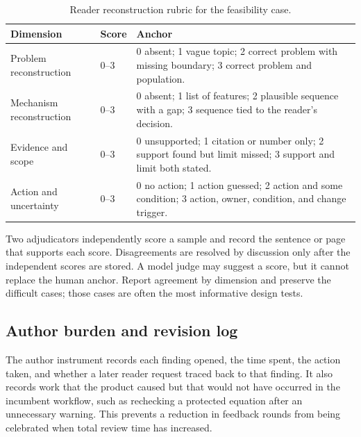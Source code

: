 \begin{table}[H]
\centering
\small
\begin{tabularx}{\textwidth}{@{}p{}p{}L@{}}
\toprule
Dimension & Score & Anchor \\
\midrule
Problem reconstruction & 0--3 & 0 absent; 1 vague topic; 2 correct problem
with missing boundary; 3 correct problem and population. \\
Mechanism reconstruction & 0--3 & 0 absent; 1 list of features; 2 plausible
sequence with a gap; 3 sequence tied to the reader's decision. \\
Evidence and scope & 0--3 & 0 unsupported; 1 citation or number only; 2
support found but limit missed; 3 support and limit both stated. \\
Action and uncertainty & 0--3 & 0 no action; 1 action guessed; 2 action and
some condition; 3 action, owner, condition, and change trigger. \\
\bottomrule
\end{tabularx}
\caption{Reader reconstruction rubric for the feasibility case.}
\label{tab:reader-instrument}
\end{table}

Two adjudicators independently score a sample and record the sentence or page
that supports each score. Disagreements are resolved by discussion only after
the independent scores are stored. A model judge may suggest a score, but it
cannot replace the human anchor. Report agreement by dimension and preserve
the difficult cases; those cases are often the most informative design tests.

\subsection{Author burden and revision log}

The author instrument records each finding opened, the time spent, the action
taken, and whether a later reader request traced back to that finding. It also
records work that the product caused but that would not have occurred in the
incumbent workflow, such as rechecking a protected equation after an
unnecessary warning. This prevents a reduction in feedback rounds from being
celebrated when total review time has increased.

